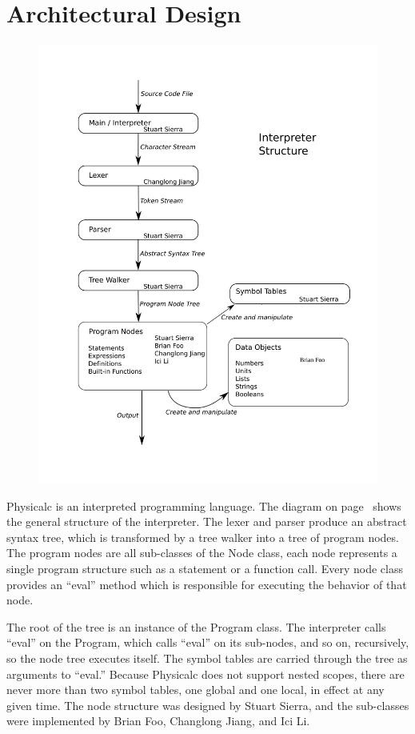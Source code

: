 \chapter{Architectural Design}

\begin{figure}[htb!]
\centering%
\includegraphics[width=1.0\textwidth]{structure}
\label{fig:structure}
\end{figure}

Physicalc is an interpreted programming language.  The diagram on
page~\pageref{fig:structure} shows the general structure of the
interpreter.  The lexer and parser produce an abstract syntax tree,
which is transformed by a tree walker into a tree of program nodes.
The program nodes are all sub-classes of the Node class, each node
represents a single program structure such as a statement or a
function call.  Every node class provides an ``eval'' method which is
responsible for executing the behavior of that node.

The root of the tree is an instance of the Program class.  The
interpreter calls ``eval'' on the Program, which calls ``eval'' on its
sub-nodes, and so on, recursively, so the node tree executes itself.
The symbol tables are carried through the tree as arguments to
``eval.''  Because Physicalc does not support nested scopes, there are
never more than two symbol tables, one global and one local, in effect
at any given time.  The node structure was designed by Stuart Sierra,
and the sub-classes were implemented by Brian Foo, Changlong Jiang,
and Ici Li.


